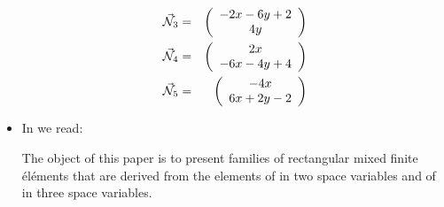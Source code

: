 \begin{itemize}
\begin{eqnarray}
\vec{{\mathcal{N}}}_3 &=&  \left(\begin{array}{c} -2x-6y+2 \\ 4y   \end{array}\right) \nonumber\\  
\vec{{\mathcal{N}}}_4 &=&  \left(\begin{array}{c} 2x \\ -6x-4y+4   \end{array}\right) \nonumber\\  
\vec{{\mathcal{N}}}_5 &=&  \left(\begin{array}{c} -4x \\ 6x +2y -2 \end{array}\right) \nonumber
\end{eqnarray}

 

\item In \cite{brdf87} we read:
\begin{displayquote}
The object of this paper is to present families of rectangular mixed finite
éléments that are derived from the elements of \cite{brdm85} 
in two space variables and of \cite{brdd87} in three space variables.
\end{displayquote}














\end{itemize}

